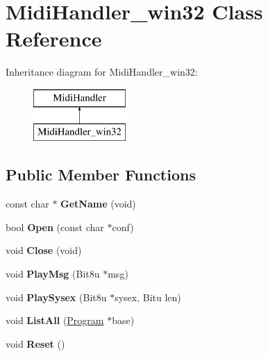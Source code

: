 \hypertarget{classMidiHandler__win32}{\section{Midi\-Handler\-\_\-win32 Class Reference}
\label{classMidiHandler__win32}
}
Inheritance diagram for Midi\-Handler\-\_\-win32\-:\begin{figure}[H]
\begin{center}
\leavevmode
\includegraphics[height=2.000000cm]{classMidiHandler__win32}
\end{center}
\end{figure}
\subsection*{Public Member Functions}
\begin{DoxyCompactItemize}
\item 
\hypertarget{classMidiHandler__win32_a5b4af7f36d2638509e870f5b72b3b190}{const char $\ast$ {\bfseries Get\-Name} (void)}\label{classMidiHandler__win32_a5b4af7f36d2638509e870f5b72b3b190}

\item 
\hypertarget{classMidiHandler__win32_a90f21afb6eda39990ffecdc90e31570f}{bool {\bfseries Open} (const char $\ast$conf)}\label{classMidiHandler__win32_a90f21afb6eda39990ffecdc90e31570f}

\item 
\hypertarget{classMidiHandler__win32_a37dd3a1fa0f368e13f2d8c4bb4721073}{void {\bfseries Close} (void)}\label{classMidiHandler__win32_a37dd3a1fa0f368e13f2d8c4bb4721073}

\item 
\hypertarget{classMidiHandler__win32_ac678ddce9e90e90c440f98183e2700fc}{void {\bfseries Play\-Msg} (Bit8u $\ast$msg)}\label{classMidiHandler__win32_ac678ddce9e90e90c440f98183e2700fc}

\item 
\hypertarget{classMidiHandler__win32_ad6f9427698e97a9c25067025bd664744}{void {\bfseries Play\-Sysex} (Bit8u $\ast$sysex, Bitu len)}\label{classMidiHandler__win32_ad6f9427698e97a9c25067025bd664744}

\item 
\hypertarget{classMidiHandler__win32_ace0402a06a0429298f09cc5bbc24225c}{void {\bfseries List\-All} (\hyperlink{classProgram}{Program} $\ast$base)}\label{classMidiHandler__win32_ace0402a06a0429298f09cc5bbc24225c}

\item 
\hypertarget{classMidiHandler__win32_ae1bd698612dfc220b2cb6dd36acd51fa}{void {\bfseries Reset} ()}\label{classMidiHandler__win32_ae1bd698612dfc220b2cb6dd36acd51fa}

\end{DoxyCompactItemize}


